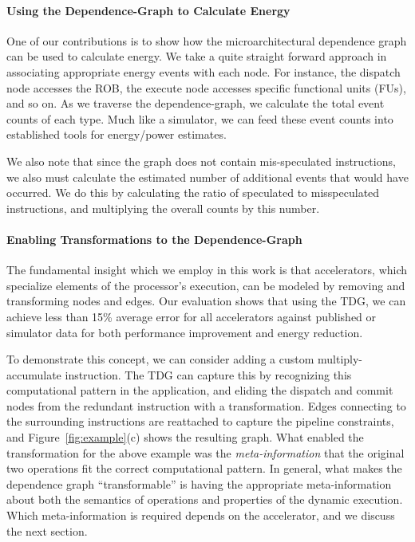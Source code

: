 \paragraph{Using the Dependence-Graph to Calculate Energy} One of our
contributions is to show how the microarchitectural dependence graph can be
used to calculate energy.  We take a quite straight forward approach in
associating appropriate energy events with each node.  For instance, the
dispatch node accesses the ROB, the execute node accesses specific functional
units (FUs), and so on.  As we traverse the dependence-graph, we calculate
the total event counts of each type.  Much like a simulator, we can feed these
event counts into established tools for energy/power estimates.

We also note that since the graph does not contain mis-speculated instructions, we
also must calculate the estimated number of additional events that would have occurred.
We do this by calculating the ratio of speculated to misspeculated instructions, and
multiplying the overall counts by this number.

\paragraph{Enabling Transformations to the Dependence-Graph}
The fundamental insight which we employ in this work is that accelerators,
which specialize elements of the processor's execution, can be modeled by
removing and transforming nodes and edges.  
Our evaluation shows that using the TDG, we
can achieve less than 15\% average error for all accelerators against published
or simulator data for both performance improvement and energy reduction.

To demonstrate this concept, we can consider adding a custom
multiply-accumulate instruction.  The TDG can capture this by recognizing this
computational pattern in the application, and eliding the dispatch and commit
nodes from the redundant instruction with a transformation.  Edges connecting
to the surrounding instructions are reattached to capture the pipeline
constraints, and Figure~\ref{fig:example}(c) shows the resulting graph.  What
enabled the transformation for the above example was the
\emph{meta-information} that the original two operations fit
the correct computational pattern. 
In general, what makes the dependence graph ``transformable'' is having the
appropriate meta-information about both the semantics of operations and
properties of the dynamic execution.  Which meta-information is required
depends on the accelerator, and we discuss the next section.

